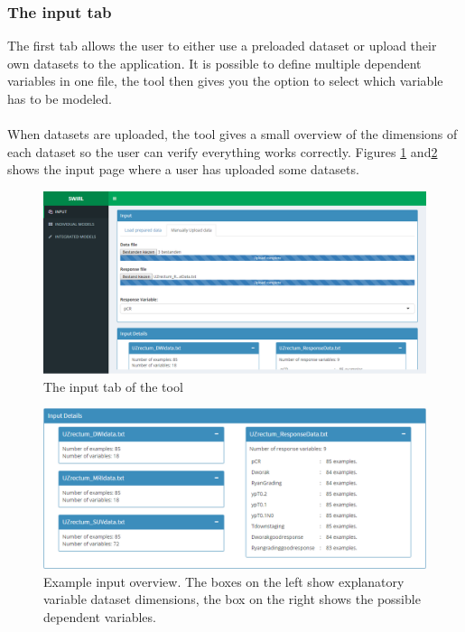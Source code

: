\subsubsection{The input tab}
The first tab allows the user to either use a preloaded dataset or upload their own datasets to the application. It is possible to define multiple dependent variables in one file, the tool then gives you the option to select which variable has to be modeled. \\ \\
When datasets are uploaded, the tool gives a small overview of the dimensions of each dataset so the user can verify everything works correctly. Figures \ref{fig:tool-input} and\ref{fig:tool-input2} shows the input page where a user has uploaded some datasets.
\begin{figure}
	\centering
	\includegraphics[scale=.3]{images/tool_input_1}
	\caption{The input tab of the tool}
	\label{fig:tool-input}
\end{figure}
\begin{figure}
	\centering
	\includegraphics[scale=.4]{images/tool_input_overview}
	\caption{Example input overview. The boxes on the left show explanatory variable dataset dimensions, the box on the right shows the possible dependent variables.}
	\label{fig:tool-input2}
\end{figure}
